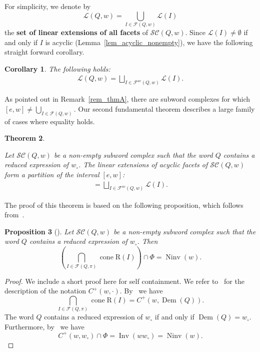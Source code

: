 \documentclass{amsart}
\newtheorem{theorem}{Theorem}[section]
\newtheorem{corollary}[theorem]{Corollary}
\newtheorem{proposition}[theorem]{Proposition}
\theoremstyle{definition}
\DeclareMathOperator{\cone}{cone} %
\DeclareMathOperator{\Inv}{Inv} %
\DeclareMathOperator{\Ninv}{Ninv} %
\DeclareMathOperator{\DemazureProduct}{Dem} %
\newcommand{\defn}[1]{\textbf{\textsf{\color{PineGreen} #1}}} %
\newcommand{\linearExtensions}{\mathcal{L}} %
\newcommand{\wo}{w_\circ} %
\newcommand{\subwordComplex}{\mathcal{SC}} %
\newcommand{\Roots}{\mathrm{R}} %
\newcommand{\subwordFacets}{\mathcal{F}} %
\newcommand{\subwordAcyclicFacets}{\mathcal{F}^{ac}} %
\begin{document}
For simplicity, we denote by 
\[
\linearExtensions(Q,w) = \bigcup_{I\in\subwordFacets(Q,w)} \linearExtensions(I)
\]
the \defn{set of linear extensions of all facets} of $\subwordComplex(Q,w)$.
Since $\linearExtensions(I)\neq \emptyset$ if and only if $I$ is acyclic (Lemma~\ref{lem_acyclic_nonempty}), we have the following straight forward corollary. 
\begin{corollary}\label{cor_linearextensions_partition}
The following holds:    
\begin{align}
    \linearExtensions(Q,w) =
    \bigsqcup_{I\in\subwordAcyclicFacets(Q,w)} \linearExtensions(I).
\end{align}
\end{corollary}

As pointed out in Remark~\ref{rem_thmA}, there are subword complexes for which $[e,w] \neq \bigcup_{I\in\subwordFacets(Q,w)}$.
Our second fundamental theorem describes a large family of cases where equality holds.

\begin{theorem}\label{thm_subword_linearextensions_B}

Let $\subwordComplex(Q,w)$ be a non-empty subword complex such that the word $Q$ contains a reduced expression of $\wo$. The linear extensions of acyclic facets of $\subwordComplex(Q,w)$ form a partition of the interval $[e,w]$:
\begin{align}
    [e,w] =
    \bigsqcup_{I\in\subwordAcyclicFacets(Q,w)} \linearExtensions(I).
\end{align}
\end{theorem}

The proof of this theorem is based on the following proposition, which follows from~\cite[Theorem~3.1 and Corollary 3.3]{jahn_bruhat_2021}.

\begin{proposition}[{\cite{jahn_bruhat_2021}}]\label{prop_jahnStump_intersection}
    Let $\subwordComplex(Q,w)$ be a non-empty subword complex such that the word $Q$ contains a reduced expression of $\wo$. Then 
    \[
\left(
\bigcap_{I\in \subwordFacets(Q,\pi)} \cone \Roots(I) 
\right)
\cap \Phi
= 
\Ninv(w).
    \]
\end{proposition}
\begin{proof}
    We include a short proof here for self containment. We refer to~\cite{jahn_bruhat_2021} for the description of the notation $C^+(w,\cdot)$. 
    By~\cite[Theorem~3.1]{jahn_bruhat_2021} we have
    \[
\bigcap_{I\in \subwordFacets(Q,\pi)} \cone \Roots(I) =
C^+(w,\DemazureProduct(Q)).
    \]
    The word $Q$ contains a reduced expression of $\wo$ if and only if $\DemazureProduct(Q)=\wo$. Furthermore, by~\cite[Corollary~3.3]{jahn_bruhat_2021} we have
    \[
C^+(w,\wo)\cap \Phi
= \Inv(w \wo) = \Ninv(w).
    \]    
\end{proof}
\end{document}

